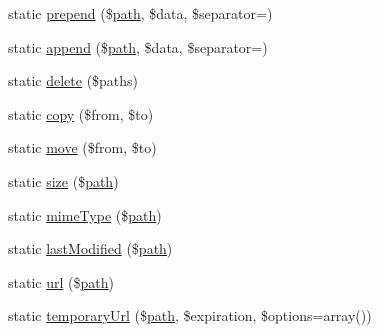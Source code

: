 \begin{DoxyCompactItemize}
static \mbox{\hyperlink{class_illuminate_1_1_support_1_1_facades_1_1_storage_a7f3aa9fd67ffdf41c613497eaa8d2afd}{prepend}} (\$\mbox{\hyperlink{class_illuminate_1_1_support_1_1_facades_1_1_storage_a7aaad06bbb92a00aa33ddbb19cd6a664}{path}}, \$data, \$separator=\textquotesingle{}\textquotesingle{})
\item 
static \mbox{\hyperlink{class_illuminate_1_1_support_1_1_facades_1_1_storage_a9ff621399c8b9c27793d036b897cf04e}{append}} (\$\mbox{\hyperlink{class_illuminate_1_1_support_1_1_facades_1_1_storage_a7aaad06bbb92a00aa33ddbb19cd6a664}{path}}, \$data, \$separator=\textquotesingle{}\textquotesingle{})
\item 
static \mbox{\hyperlink{class_illuminate_1_1_support_1_1_facades_1_1_storage_afc991fa4fdaf1a6c91f6cbba6e043147}{delete}} (\$paths)
\item 
static \mbox{\hyperlink{class_illuminate_1_1_support_1_1_facades_1_1_storage_a8f5a8fdcb5523594578481c921aacd30}{copy}} (\$from, \$to)
\item 
static \mbox{\hyperlink{class_illuminate_1_1_support_1_1_facades_1_1_storage_a4d66b8253e6f77937b0d0a66883b15c0}{move}} (\$from, \$to)
\item 
static \mbox{\hyperlink{class_illuminate_1_1_support_1_1_facades_1_1_storage_aa985db748918c7dc6fc35c2603654e47}{size}} (\$\mbox{\hyperlink{class_illuminate_1_1_support_1_1_facades_1_1_storage_a7aaad06bbb92a00aa33ddbb19cd6a664}{path}})
\item 
static \mbox{\hyperlink{class_illuminate_1_1_support_1_1_facades_1_1_storage_a85d3efe936f8fab53debba18b2c1ae89}{mime\+Type}} (\$\mbox{\hyperlink{class_illuminate_1_1_support_1_1_facades_1_1_storage_a7aaad06bbb92a00aa33ddbb19cd6a664}{path}})
\item 
static \mbox{\hyperlink{class_illuminate_1_1_support_1_1_facades_1_1_storage_a1e62dada5253fa261cf0b84a0477b29b}{last\+Modified}} (\$\mbox{\hyperlink{class_illuminate_1_1_support_1_1_facades_1_1_storage_a7aaad06bbb92a00aa33ddbb19cd6a664}{path}})
\item 
static \mbox{\hyperlink{class_illuminate_1_1_support_1_1_facades_1_1_storage_a9eb74e56a9b983c010c07ae1313ba186}{url}} (\$\mbox{\hyperlink{class_illuminate_1_1_support_1_1_facades_1_1_storage_a7aaad06bbb92a00aa33ddbb19cd6a664}{path}})
\item 
static \mbox{\hyperlink{class_illuminate_1_1_support_1_1_facades_1_1_storage_a48ce8ba27e5680780867b3aea37805a6}{temporary\+Url}} (\$\mbox{\hyperlink{class_illuminate_1_1_support_1_1_facades_1_1_storage_a7aaad06bbb92a00aa33ddbb19cd6a664}{path}}, \$expiration, \$options=array())

\end{DoxyCompactItemize}
